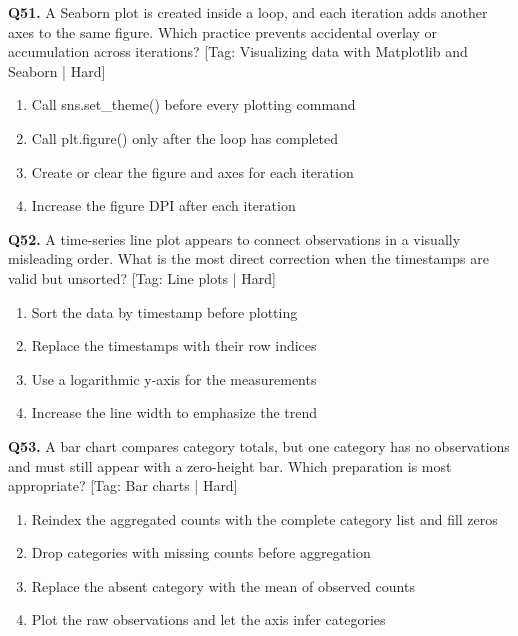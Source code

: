 \vspace{2mm}
\noindent\textbf{Q51.} A Seaborn plot is created inside a loop, and each iteration adds another axes to the same figure. Which practice prevents accidental overlay or accumulation across iterations? \hfill [Tag: Visualizing data with Matplotlib and Seaborn | Hard]
\begin{enumerate}[label=(\alph*),topsep=2pt,itemsep=1pt,partopsep=0pt,parsep=0pt]
    \item {Call sns.set\_theme() before every plotting command}
    \item {Call plt.figure() only after the loop has completed}
    \item {Create or clear the figure and axes for each iteration}
    \item {Increase the figure DPI after each iteration}
\end{enumerate}
\vspace{2mm}
\noindent\textbf{Q52.} A time-series line plot appears to connect observations in a visually misleading order. What is the most direct correction when the timestamps are valid but unsorted? \hfill [Tag: Line plots | Hard]
\begin{enumerate}[label=(\alph*),topsep=2pt,itemsep=1pt,partopsep=0pt,parsep=0pt]
    \item {Sort the data by timestamp before plotting}
    \item {Replace the timestamps with their row indices}
    \item {Use a logarithmic y-axis for the measurements}
    \item {Increase the line width to emphasize the trend}
\end{enumerate}
\vspace{2mm}
\noindent\textbf{Q53.} A bar chart compares category totals, but one category has no observations and must still appear with a zero-height bar. Which preparation is most appropriate? \hfill [Tag: Bar charts | Hard]
\begin{enumerate}[label=(\alph*),topsep=2pt,itemsep=1pt,partopsep=0pt,parsep=0pt]
    \item {Reindex the aggregated counts with the complete category list and fill zeros}
    \item {Drop categories with missing counts before aggregation}
    \item {Replace the absent category with the mean of observed counts}
    \item {Plot the raw observations and let the axis infer categories}
\end{enumerate}

